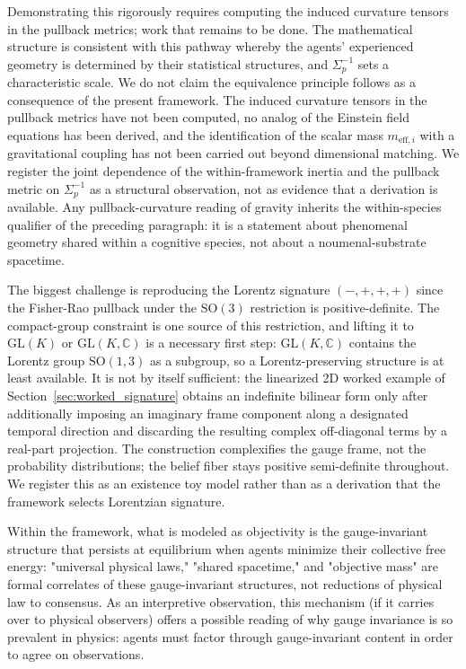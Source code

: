 \documentclass[11pt]{article}
\begin{document}
Demonstrating this rigorously requires computing the induced curvature tensors in the pullback metrics; work that remains to be done. The mathematical structure is consistent with this pathway whereby the agents' experienced geometry is determined by their statistical structures, and $\Sigma_p^{-1}$ sets a characteristic scale. We do not claim the equivalence principle follows as a consequence of the present framework. The induced curvature tensors in the pullback metrics have not been computed, no analog of the Einstein field equations has been derived, and the identification of the scalar mass $m_{\text{eff},i}$ with a gravitational coupling has not been carried out beyond dimensional matching. We register the joint dependence of the within-framework inertia and the pullback metric on $\Sigma_p^{-1}$ as a structural observation, not as evidence that a derivation is available. Any pullback-curvature reading of gravity inherits the within-species qualifier of the preceding paragraph: it is a statement about phenomenal geometry shared within a cognitive species, not about a noumenal-substrate spacetime.

The biggest challenge is reproducing the Lorentz signature $(-,+,+,+)$ since the Fisher-Rao pullback under the $\mathrm{SO}(3)$ restriction is positive-definite. The compact-group constraint is one source of this restriction, and lifting it to $\mathrm{GL}(K)$ or $\mathrm{GL}(K, \mathbb{C})$ is a necessary first step: $\mathrm{GL}(K, \mathbb{C})$ contains the Lorentz group $\mathrm{SO}(1,3)$ as a subgroup, so a Lorentz-preserving structure is at least available. It is not by itself sufficient: the linearized 2D worked example of Section~\ref{sec:worked_signature} obtains an indefinite bilinear form only after additionally imposing an imaginary frame component along a designated temporal direction and discarding the resulting complex off-diagonal terms by a real-part projection. The construction complexifies the gauge frame, not the probability distributions; the belief fiber stays positive semi-definite throughout. We register this as an existence toy model rather than as a derivation that the framework selects Lorentzian signature.

Within the framework, what is modeled as objectivity is the gauge-invariant structure that persists at equilibrium when agents minimize their collective free energy: "universal physical laws," "shared spacetime," and "objective mass" are formal correlates of these gauge-invariant structures, not reductions of physical law to consensus. As an interpretive observation, this mechanism (if it carries over to physical observers) offers a possible reading of why gauge invariance is so prevalent in physics: agents must factor through gauge-invariant content in order to agree on observations.
\end{document}
